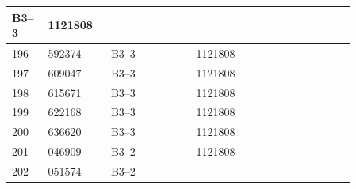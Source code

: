 \documentclass[UTF8,10pt,a4paper,fontset=fandol]{ctexart}
\newcommand{\fieldvalue}[1]{#1}
\begin{document}
\begin{tabular}{|p{0.07\linewidth}|p{0.16\linewidth}|p{0.22\linewidth}|p{0.23\linewidth}|p{0.18\linewidth}|}
\fieldvalue{B3--3} &
\fieldvalue{1121808} & \\
\hline
\fieldvalue{196} &
\fieldvalue{592374} &
\fieldvalue{B3--3} &
\fieldvalue{1121808} & \\
\hline
\fieldvalue{197} &
\fieldvalue{609047} &
\fieldvalue{B3--3} &
\fieldvalue{1121808} & \\
\hline
\fieldvalue{198} &
\fieldvalue{615671} &
\fieldvalue{B3--3} &
\fieldvalue{1121808} & \\
\hline
\fieldvalue{199} &
\fieldvalue{622168} &
\fieldvalue{B3--3} &
\fieldvalue{1121808} & \\
\hline
\fieldvalue{200} &
\fieldvalue{636620} &
\fieldvalue{B3--3} &
\fieldvalue{1121808} & \\
\hline
\fieldvalue{201} &
\fieldvalue{046909} &
\fieldvalue{B3--2} &
\fieldvalue{1121808} & \\
\hline
\fieldvalue{202} &
\fieldvalue{051574} &
\fieldvalue{B3--2} &

\end{tabular}
\end{document}
